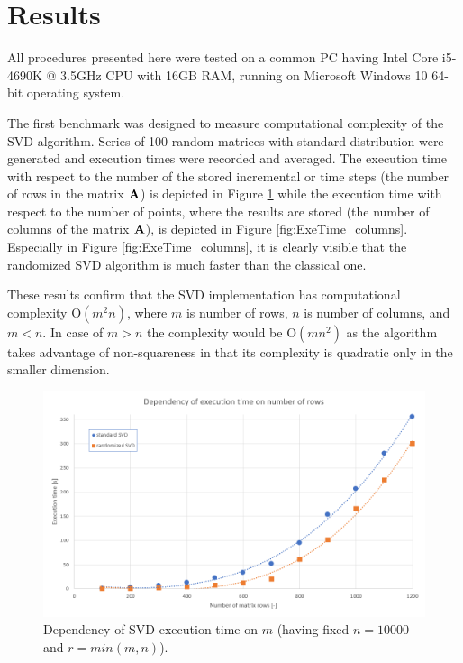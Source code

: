 \section{Results}
\label{sec:results}

All procedures presented here were tested on a common PC having Intel Core i5-4690K @ 3.5GHz CPU with 16GB RAM, running on Microsoft Windows 10 64-bit operating system.

The first benchmark was designed to measure computational complexity of the SVD algorithm. Series of 100 random matrices with standard distribution were generated and execution times were recorded and averaged. The execution time with respect to the number of the stored incremental or time steps (the number of rows in the matrix $\mathbf{A}$) is depicted in Figure \ref{fig:ExeTime_rows} while the execution time with respect to the number of points, where the results are stored (the number of columns of the matrix $\mathbf{A}$), is depicted in Figure \ref{fig:ExeTime_columns}. Especially in Figure \ref{fig:ExeTime_columns}, it is clearly visible that the randomized SVD algorithm is much faster than the classical one.

These results confirm that the SVD implementation has computational complexity $\mathrm{O}(m^2n)$, where $m$ is number of rows, $n$ is number of columns, and $m < n$. In case of $m > n$ the complexity would be $\mathrm{O}(mn^2)$ as the algorithm takes advantage of non-squareness in that its complexity is quadratic only in the smaller dimension.

\begin{figure}[H]
\centering\includegraphics[width=\textwidth]{figures/executionTime_varyingRows}
\caption{Dependency of SVD execution time on $m$ (having fixed $n = 10000$ and $r=min(m,n)$).}
\label{fig:ExeTime_rows}
\end{figure}


